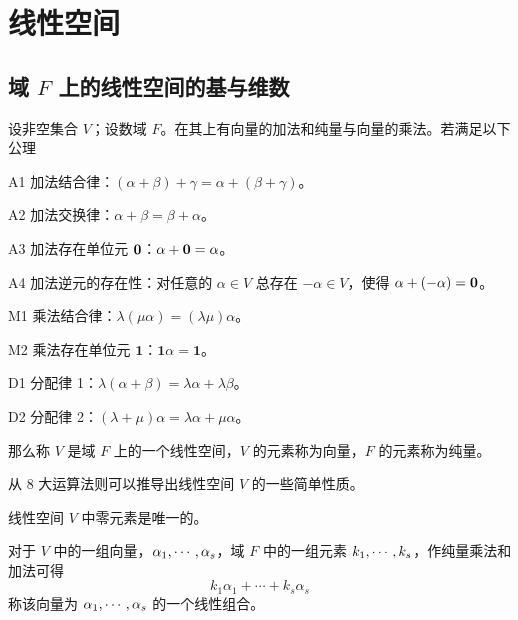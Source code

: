 
\chapter{线性空间}

\section{\texorpdfstring{域 $F$ 上的线性空间的基与维数}{域 F 上的线性空间的基与维数}}

\begin{definition}[线性空间]
    设非空集合 $V$；设数域 $F$。在其上有向量的加法和纯量与向量的乘法。若满足以下公理

    A1 加法结合律：$(\alpha+\beta) + \gamma = \alpha +(\beta+\gamma)$。
    
    A2 加法交换律：$\alpha + \beta = \beta + \alpha$。
    
    A3 加法存在单位元 $\boldsymbol{0}$：$\alpha + \boldsymbol{0} = \alpha$。
    
    A4 加法逆元的存在性：对任意的 $\alpha \in V$ 总存在 $-\alpha\in V$，使得 $\alpha + (-\alpha) = \boldsymbol{0}$。
    
    M1 乘法结合律：$\lambda(\mu \alpha) = (\lambda \mu) \alpha$。
    
    M2 乘法存在单位元 $\boldsymbol{1}$：$\boldsymbol{1} \alpha = \boldsymbol{1}$。
    
    D1 分配律 1：$\lambda(\alpha+\beta) = \lambda \alpha + \lambda \beta$。
    
    D2 分配律 2：$(\lambda + \mu)\alpha = \lambda \alpha + \mu \alpha$。

    那么称 $V$ 是域 $F$ 上的一个线性空间，$V$ 的元素称为向量，$F$ 的元素称为纯量。
\end{definition}

从 $8$ 大运算法则可以推导出线性空间 $V$ 的一些简单性质。

\begin{theorem}
    线性空间 $V$ 中零元素是唯一的。
\end{theorem}

对于 $V$ 中的一组向量，$\alpha_1,\cdots,\alpha_s$，域 $F$ 中的一组元素 $k_1,\cdots,k_s$，作纯量乘法和加法可得
\[ k_1\alpha_1+\cdots+k_s\alpha_s \]
称该向量为 $\alpha_1,\cdots,\alpha_s$ 的一个线性组合。

